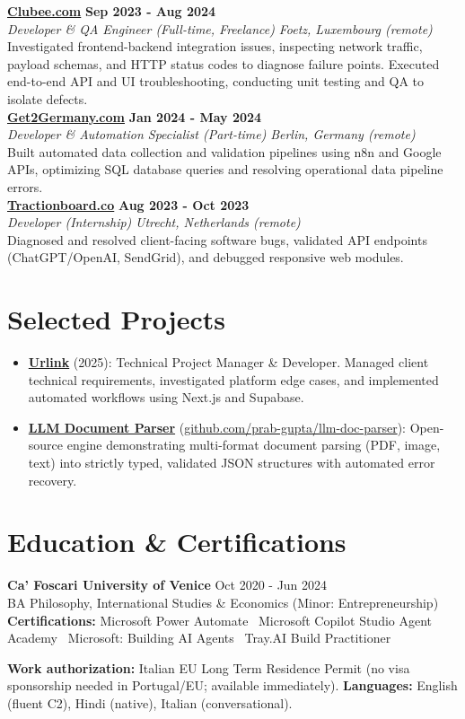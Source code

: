 \documentclass[a4paper,10pt]{article}
\newcommand{\role}[4]{%
  \textbf{#1} \hfill \textbf{#2}\\[1pt]%
  \textit{#3} \hfill \textit{#4}\\[2pt]%
}
\begin{document}
\role{\href{https://clubee.com}{Clubee.com}}{Sep 2023 - Aug 2024}{Developer \& QA Engineer (Full-time, Freelance)}{Foetz, Luxembourg (remote)}
Investigated frontend-backend integration issues, inspecting network traffic, payload schemas, and HTTP status codes to diagnose failure points. Executed end-to-end API and UI troubleshooting, conducting unit testing and QA to isolate defects.\\[1pt]

\role{\href{https://get2germany.com}{Get2Germany.com}}{Jan 2024 - May 2024}{Developer \& Automation Specialist (Part-time)}{Berlin, Germany (remote)}
Built automated data collection and validation pipelines using n8n and Google APIs, optimizing SQL database queries and resolving operational data pipeline errors.\\[1pt]

\role{\href{https://tractionboard.co}{Tractionboard.co}}{Aug 2023 - Oct 2023}{Developer (Internship)}{Utrecht, Netherlands (remote)}
Diagnosed and resolved client-facing software bugs, validated API endpoints (ChatGPT/OpenAI, SendGrid), and debugged responsive web modules.

\section{Selected Projects}
\begin{itemize}
  \item \textbf{\href{https://smarturlink.com/}{Urlink}} (2025): Technical Project Manager \& Developer. Managed client technical requirements, investigated platform edge cases, and implemented automated workflows using Next.js and Supabase.
  \item \textbf{\href{https://github.com/prab-gupta/llm-doc-parser}{LLM Document Parser}} (\href{https://github.com/prab-gupta/llm-doc-parser}{github.com/prab-gupta/llm-doc-parser}): Open-source engine demonstrating multi-format document parsing (PDF, image, text) into strictly typed, validated JSON structures with automated error recovery.
\end{itemize}

\section{Education \& Certifications}
\textbf{Ca' Foscari University of Venice} \hfill Oct 2020 - Jun 2024\\
BA Philosophy, International Studies \& Economics (Minor: Entrepreneurship)\\[1pt]
\textbf{Certifications:} Microsoft Power Automate \textbullet\ Microsoft Copilot Studio Agent Academy \textbullet\ Microsoft: Building AI Agents \textbullet\ Tray.AI Build Practitioner

\vspace{2pt}
{\small \textbf{Work authorization:} Italian EU Long Term Residence Permit (no visa sponsorship needed in Portugal/EU; available immediately). \quad \textbf{Languages:} English (fluent C2), Hindi (native), Italian (conversational).}
\end{document}

